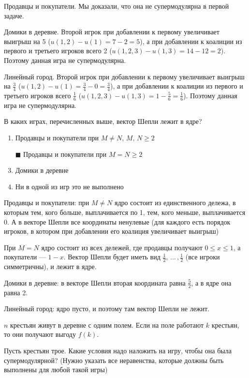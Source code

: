 	\solution
	Продавцы и покупатели. Мы доказали, что она не супермодулярна в первой задаче.

	Домики в деревне. Второй игрок при добавлении к первому увеличивает выигрыш на 5 ($u(1,2)-u(1)=7-2=5$), а при добавлении к коалиции из первого и третьего игроков всего 2 ($u(1,2,3)-u(1,3)=14-12=2$). Поэтому данная игра не супермодулярна.

	Линейный город. Второй игрок при добавлении к первому увеличивает выигрыш на $\frac{3}{4}$ ($u(1,2)-u(1)=\frac{3}{4}-0=\frac{3}{4}$), а при добавлении к коалиции из первого и третьего игроков всего $\frac{1}{6}$ ($u(1,2,3)-u(1,3)=1-\frac{5}{6}=\frac{1}{6}$). Поэтому данная игра не супермодулярна.
	
	\task
	В каких играх, перечисленных выше, вектор Шепли лежит в ядре?
	
	\begin{enumerate}[label=$\square$]
		\item Продавцы и покупатели при $M \neq N,\, M,\, N \geq 2$
		\item[$\blacksquare$] Продавцы и покупатели при $M = N \geq 2$
		\item Домики в деревне
		\item Ни в одной из игр это не выполнено
	\end{enumerate}
	
	\solution
	Продавцы и покупатели: при $M \neq N$ ядро состоит из единственного дележа, в которым тем, кого больше, выплачивается по 1, тем, кого меньше, выплачивается 0. А в векторе Шепли все координаты ненулевые (для каждого есть порядок игроков, в котором при добавлении его коалиция увеличивает выигрыш)

	При $M = N$ ядро состоит из всех дележей, где продавцы получают $0 \leq x \leq 1$, а покупатели --- $1-x$. Вектор Шепли будет иметь вид $\frac{1}{2},\,\ldots\,,\frac{1}{2}$ (все игроки симметричны), и лежит в ядре.
	
	Домики в деревне: в векторе Шепли вторая координата равна $\frac{5}{2}$, а в ядре она равна 2.

	Линейный город: ядро пусто, и поэтому там вектор Шепли не лежит.
	
	\task
	$n$ крестьян живут в деревне с одним полем. Если на поле работают $k$ крестьян, то они получают выгоду $f(k)$.
	
	Пусть крестьян трое. Какие условия надо наложить на игру, чтобы она была супермодулярной? (Нужно указать все неравенства, которые должны быть выполнены для любой такой игры)
	
